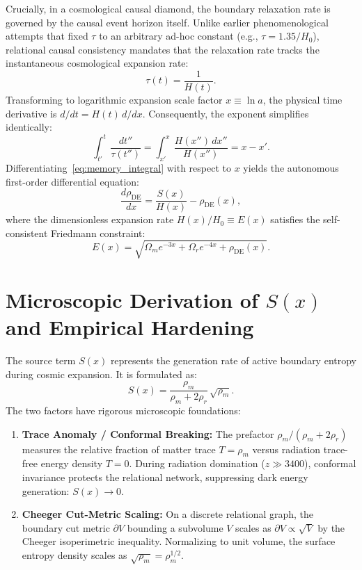 \documentclass[10pt,twocolumn]{article}
\begin{document}
Crucially, in a cosmological causal diamond, the boundary relaxation rate is governed by the causal event horizon itself. Unlike earlier phenomenological attempts that fixed $\tau$ to an arbitrary ad-hoc constant (e.g., $\tau = 1.35/H_0$), relational causal consistency mandates that the relaxation rate tracks the instantaneous cosmological expansion rate:
\begin{equation}
\tau(t) = \frac{1}{H(t)}.
\label{eq:horizon_lock}
\end{equation}
Transforming to logarithmic expansion scale factor $x \equiv \ln a$, the physical time derivative is $d/dt = H(t)\,d/dx$. Consequently, the exponent simplifies identically:
\begin{equation}
\int_{t'}^t \frac{dt''}{\tau(t'')} = \int_{x'}^x \frac{H(x'')\,dx''}{H(x'')} = x - x'.
\end{equation}
Differentiating~\eqref{eq:memory_integral} with respect to $x$ yields the autonomous first-order differential equation:
\begin{equation}
\frac{d\rho_{\mathrm{DE}}}{dx} = \frac{S(x)}{H(x)} - \rho_{\mathrm{DE}}(x),
\label{eq:ode_main}
\end{equation}
where the dimensionless expansion rate $H(x)/H_0 \equiv E(x)$ satisfies the self-consistent Friedmann constraint:
\begin{equation}
E(x) = \sqrt{\Omega_m e^{-3x} + \Omega_r e^{-4x} + \rho_{\mathrm{DE}}(x)}.
\label{eq:friedmann}
\end{equation}

\section{Microscopic Derivation of \texorpdfstring{$S(x)$}{S(x)} and Empirical Hardening}
The source term $S(x)$ represents the generation rate of active boundary entropy during cosmic expansion. It is formulated as:
\begin{equation}
S(x) = \frac{\rho_m}{\rho_m + 2\rho_r} \, \sqrt{\rho_m}.
\label{eq:source}
\end{equation}
The two factors have rigorous microscopic foundations:
\begin{enumerate}
\item \textbf{Trace Anomaly / Conformal Breaking:} The prefactor $\rho_m / (\rho_m + 2\rho_r)$ measures the relative fraction of matter trace $T = \rho_m$ versus radiation trace-free energy density $T = 0$. During radiation domination ($z \gg 3400$), conformal invariance protects the relational network, suppressing dark energy generation: $S(x) \to 0$.
\item \textbf{Cheeger Cut-Metric Scaling:} On a discrete relational graph, the boundary cut metric $\partial V$ bounding a subvolume $V$ scales as $\partial V \propto \sqrt{V}$ by the Cheeger isoperimetric inequality. Normalizing to unit volume, the surface entropy density scales as $\sqrt{\rho_m} = \rho_m^{1/2}$.
\end{enumerate}
\end{document}
